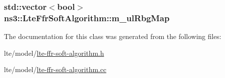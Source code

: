 \subsubsection[{\texorpdfstring{m\+\_\+ul\+Rbg\+Map}{m_ulRbgMap}}]{\setlength{\rightskip}{0pt plus 5cm}std\+::vector$<$bool$>$ ns3\+::\+Lte\+Ffr\+Soft\+Algorithm\+::m\+\_\+ul\+Rbg\+Map\hspace{0.3cm}{\ttfamily [private]}}\hypertarget{classns3_1_1LteFfrSoftAlgorithm_a26b7bacc26f0b5b41d313fa501fdce87}{}\label{classns3_1_1LteFfrSoftAlgorithm_a26b7bacc26f0b5b41d313fa501fdce87}


The documentation for this class was generated from the following files\+:\begin{DoxyCompactItemize}
\item 
lte/model/\hyperlink{lte-ffr-soft-algorithm_8h}{lte-\/ffr-\/soft-\/algorithm.\+h}\item 
lte/model/\hyperlink{lte-ffr-soft-algorithm_8cc}{lte-\/ffr-\/soft-\/algorithm.\+cc}\end{DoxyCompactItemize}
